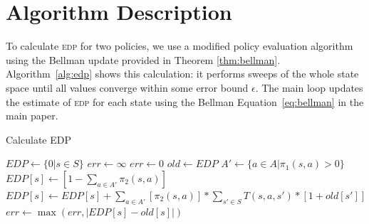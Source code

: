 \documentclass[letterpaper]{article}
\begin{document}





\appendix
\section{Algorithm Description}
To calculate \textsc{edp} for two policies, we use a modified policy evaluation algorithm~\cite{bellman1966dynamic} using the Bellman update provided in Theorem \ref{thm:bellman}. Algorithm~\ref{alg:edp} shows this calculation: it performs sweeps of the whole state space until all values converge within some error bound $\epsilon$. The main loop updates the estimate of \textsc{edp} for each state using the Bellman Equation~\ref{eq:bellman} in the main paper.


\begin{algorithm}
\caption{Calculate EDP}
\begin{algorithmic}
\State $EDP \gets \{0 | s \in S\}$
\State $err \gets \infty$
\State $err \gets 0$
\State $old \gets EDP$
\State $A' \gets \{a\in A | \pi_1(s,a) > 0\}$
\State $EDP[s] \gets [1 - \sum\limits_{a\in A'}\pi_2(s,a)]$
\State $EDP[s] \gets EDP[s] + \sum\limits_{a \in A'}[\pi_2(s, a)] * \sum\limits_{s'\in S} T(s, a, s') * [1 + old[s']]$
\State $err \gets \max{(err, |EDP[s] - old[s]|)}$
\EndFor
\EndWhile
\EndProcedure
\end{algorithmic}
\label{alg:edp}
\end{algorithm}

\end{document}
